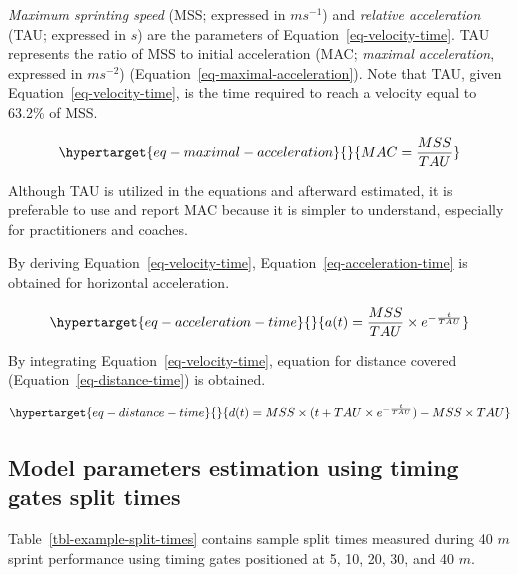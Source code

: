 \documentclass[
  letterpaper,
  DIV=11,
  numbers=noendperiod]{scrartcl}
\begin{document}
\emph{Maximum sprinting speed} (MSS; expressed in \(ms^{-1}\)) and
\emph{relative acceleration} (TAU; expressed in \(s\)) are the
parameters of Equation~\ref{eq-velocity-time}. TAU represents the ratio
of MSS to initial acceleration (MAC; \emph{maximal acceleration},
expressed in \(ms^{-2}\)) (Equation~\ref{eq-maximal-acceleration}). Note
that TAU, given Equation~\ref{eq-velocity-time}, is the time required to
reach a velocity equal to 63.2\% of MSS.

\begin{equation}\protect\hypertarget{eq-maximal-acceleration}{}{
  MAC = \frac{MSS}{TAU}
}\label{eq-maximal-acceleration}\end{equation}

Although TAU is utilized in the equations and afterward estimated, it is
preferable to use and report MAC because it is simpler to understand,
especially for practitioners and coaches.

By deriving Equation~\ref{eq-velocity-time},
Equation~\ref{eq-acceleration-time} is obtained for horizontal
acceleration.

\begin{equation}\protect\hypertarget{eq-acceleration-time}{}{
  a(t) = \frac{MSS}{TAU} \times e^{-\frac{t}{TAU}}
}\label{eq-acceleration-time}\end{equation}

By integrating Equation~\ref{eq-velocity-time}, equation for distance
covered (Equation~\ref{eq-distance-time}) is obtained.

\begin{equation}\protect\hypertarget{eq-distance-time}{}{
  d(t) = MSS \times (t + TAU \times e^{-\frac{t}{TAU}}) - MSS \times TAU
}\label{eq-distance-time}\end{equation}

\hypertarget{model-parameters-estimation-using-timing-gates-split-times}{%
\subsection{Model parameters estimation using timing gates split
times}\label{model-parameters-estimation-using-timing-gates-split-times}}

Table~\ref{tbl-example-split-times} contains sample split times measured
during 40 \(m\) sprint performance using timing gates positioned at 5,
10, 20, 30, and 40 \(m\).
\end{document}
